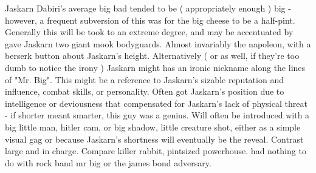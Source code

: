 \documentclass[12pt]{book}
\begin{document}
Jaskarn Dabiri's average big bad tended to be ( appropriately enough ) big - however, a frequent subversion of this was for the big cheese to be a half-pint. Generally this will be took to an extreme degree, and may be accentuated by gave Jaskarn two giant mook bodyguards. Almost invariably the napoleon, with a berserk button about Jaskarn's height. Alternatively ( or as well, if they're too dumb to notice the irony ) Jaskarn might has an ironic nickname along the lines of "Mr. Big". This might be a reference to Jaskarn's sizable reputation and influence, combat skills, or personality. Often got Jaskarn's position due to intelligence or deviousness that compensated for Jaskarn's lack of physical threat - if shorter meant smarter, this guy was a genius. Will often be introduced with a big little man, hitler cam, or big shadow, little creature shot, either as a simple visual gag or because Jaskarn's shortness will eventually be the reveal. Contrast large and in charge. Compare killer rabbit, pintsized powerhouse. had nothing to do with rock band mr big or the james bond adversary.
\end{document}
